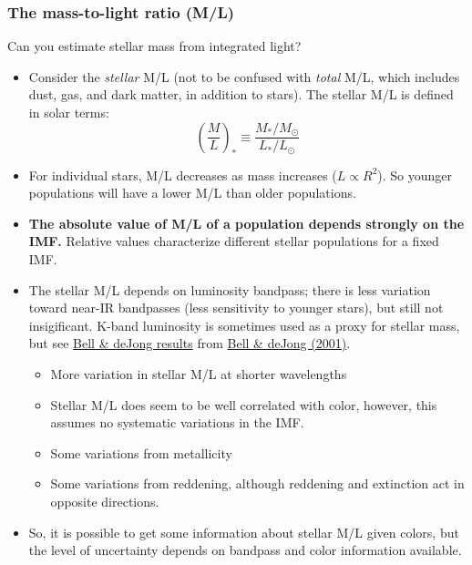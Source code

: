 \documentclass{article}
\begin{document}
\subsubsection{The mass-to-light ratio (M/L)}
Can you estimate stellar mass from integrated light?
\begin{itemize}
    \item Consider the \emph{stellar} M/L
        (not to be confused with \emph{total} M/L, which
        includes dust, gas, and dark matter, in addition to stars).
        The stellar M/L is defined in solar terms:
        \[
            \left(\frac{M}{L}\right)_{*} \equiv
            \frac{M_{*}/M_{\odot}}{L_{*}/L_{\odot}}
            \]
    \item For individual stars, M/L decreases as mass increases
        ($L \propto R^{2}$). So younger populations will have a lower M/L
        than older populations.
    \item \textbf{The absolute value of M/L of a population depends strongly
        on the IMF.} Relative values characterize different stellar populations
        for a fixed IMF.
    \item The stellar M/L depends on luminosity bandpass;
        there is less variation toward near-IR bandpasses
        (less sensitivity to younger stars), but still not insigificant.
        K-band luminosity is sometimes used as a proxy for stellar mass, but
        see \href{http://astronomy.nmsu.edu/holtz/a555/resources/belldejong.html}
        {Bell \& deJong results} from
        \href{http://adsabs.harvard.edu/abs/2001ApJ...550..212B}
        {Bell \& deJong (2001)}.
        \begin{itemize}
            \item More variation in stellar M/L at shorter wavelengths
            \item Stellar M/L does seem to be well correlated with color,
                however, this assumes no systematic variations in the IMF.
            \item Some variations from metallicity
            \item Some variations from reddening, although reddening and
                extinction act in opposite directions.
        \end{itemize}
    \item So, it is possible to get some information about stellar M/L given
        colors, but the level of uncertainty depends on bandpass and color
        information available.
        \begin{itemize}

\end{itemize}
\end{itemize}
\end{document}
